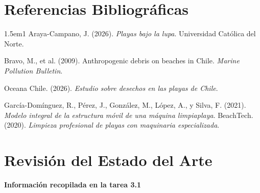 \documentclass[12pt]{article}
\begin{document}
\section*{Referencias Bibliográficas}
\begin{hangparas}{1.5em}{1}
Araya-Campano, J. (2026). \textit{Playas bajo la lupa}. Universidad Católica del Norte.

Bravo, M., et al. (2009). Anthropogenic debris on beaches in Chile. \textit{Marine Pollution Bulletin}.

Oceana Chile. (2026). \textit{Estudio sobre desechos en las playas de Chile}.

García-Domínguez, R., Pérez, J., González, M., López, A., y Silva, F. (2021). \textit{Modelo integral de la estructura móvil de una máquina limpiaplaya}.
BeachTech. (2020). \textit{Limpieza profesional de playas con maquinaria especializada}.

\end{hangparas}


\newpage
\appendix
{}

\section{Revisión del Estado del Arte}

\textbf{Información recopilada en la tarea 3.1}
\end{document}
